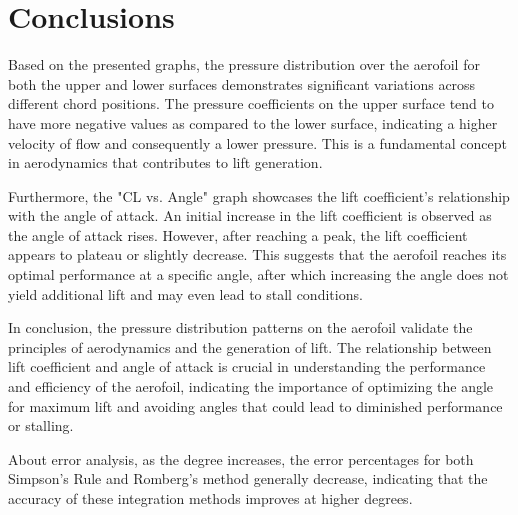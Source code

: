 \vspace{2cm}
\section{Conclusions}
\FloatBarrier %

Based on the presented graphs, the pressure distribution over the aerofoil for both the upper and lower surfaces demonstrates significant variations across different chord positions. The pressure coefficients on the upper surface tend to have more negative values as compared to the lower surface, indicating a higher velocity of flow and consequently a lower pressure. This is a fundamental concept in aerodynamics that contributes to lift generation.

Furthermore, the "CL vs. Angle" graph showcases the lift coefficient's relationship with the angle of attack. An initial increase in the lift coefficient is observed as the angle of attack rises. However, after reaching a peak, the lift coefficient appears to plateau or slightly decrease. This suggests that the aerofoil reaches its optimal performance at a specific angle, after which increasing the angle does not yield additional lift and may even lead to stall conditions.

In conclusion, the pressure distribution patterns on the aerofoil validate the principles of aerodynamics and the generation of lift. The relationship between lift coefficient and angle of attack is crucial in understanding the performance and efficiency of the aerofoil, indicating the importance of optimizing the angle for maximum lift and avoiding angles that could lead to diminished performance or stalling.

About error analysis, as the degree increases, the error percentages for both Simpson's Rule and Romberg's method generally decrease, indicating that the accuracy of these integration methods improves at higher degrees.